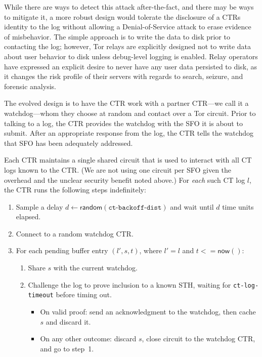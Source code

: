 While there are ways to detect this attack after-the-fact, and there may be ways
to mitigate it, a more robust design would tolerate the disclosure of a CTRs
identity to the log without allowing a Denial-of-Service attack to erase
evidence of misbehavior.  The simple approach is to write the data to disk prior
to contacting the log; however, Tor relays are explicitly designed not to write
data about user behavior to disk unless debug-level logging is enabled. Relay
operators have expressed an explicit desire to never have any user data
persisted to disk, as it changes the risk profile of their servers with regards
to search, seizure, and forensic analysis.

The evolved design is to have the CTR work with a partner CTR---we call it a
watchdog---whom they choose at random and contact over a Tor circuit. Prior to
talking to a log, the CTR provides the watchdog with the SFO it is about to
submit. After an appropriate response from the log, the CTR tells the watchdog
that SFO has been adequately addressed.

Each CTR maintains a single shared circuit that is used to interact with all CT
logs known to the CTR\@. (We are not using one circuit per SFO given the
overhead and the unclear security benefit noted above.) For \emph{each} such CT
log $l$, the CTR runs the following steps indefinitely:
\begin{enumerate}
    \item\label{enm:auditing:backoff} Sample a delay $d \gets
        \mathsf{random}(\texttt{ct-backoff-dist})$ and wait until $d$ time units
        elapsed.
    \item Connect to a random watchdog CTR\@.
    \item\label{enm:auditing:loop} For each pending buffer entry $(l',s,t)$,
    where $l' = l$ and $t <= \mathsf{now}()$:
		\begin{enumerate}
			\item\label{enm:ext:auditing:watchdog} Share $s$ with the current
				watchdog.
			\item\label{enm:ext:auditing:challenge} Challenge the log to prove
                                  inclusion to a known STH, waiting for
                                  \texttt{ct-log-timeout} before timing out.
				\begin{itemize}
					\item\label{enm:ext:auditing:challenge:success} On valid
						proof: send an acknowledgment to the watchdog, then
						cache $s$ and discard it.
					\item\label{enm:ext:auditing:challenge:fail} On any other
						outcome: discard $s$, close circuit to the watchdog CTR,
						and go to step~1.
				\end{itemize}
		\end{enumerate}
\end{enumerate}


